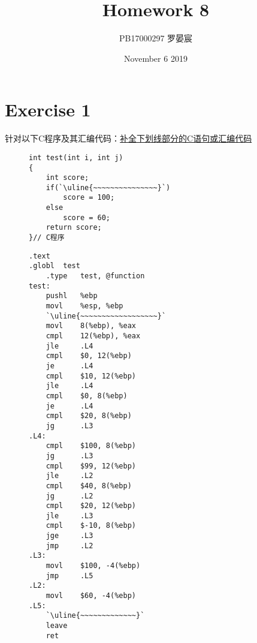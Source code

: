 \documentclass{article}
\title{Homework 8}
\author{PB17000297 罗晏宸}
\date{November 6 2019}
\begin{document}
\maketitle

\section*{Exercise 1}
针对以下C程序及其汇编代码：\uline{补全下划线部分的C语句或汇编代码}

\begin{figure}[H]
    \centering
    \begin{lstlisting}[style = C]
int test(int i, int j)
{
    int score;
    if(`\uline{~~~~~~~~~~~~~~~}`)
        score = 100;
    else
        score = 60;
    return score;
}// C程序
    \end{lstlisting}
\end{figure}

\begin{figure}[H]
    \centering
    \begin{lstlisting}[style = Assembler, lineskip = 0.2em]
.text
.globl  test
    .type   test, @function
test:
    pushl   %ebp
    movl    %esp, %ebp
    `\uline{~~~~~~~~~~~~~~~~~~}`
    movl    8(%ebp), %eax
    cmpl    12(%ebp), %eax
    jle     .L4
    cmpl    $0, 12(%ebp)
    je      .L4
    cmpl    $10, 12(%ebp)
    jle     .L4
    cmpl    $0, 8(%ebp)
    je      .L4
    cmpl    $20, 8(%ebp)
    jg      .L3
.L4:
    cmpl    $100, 8(%ebp)
    jg      .L3
    cmpl    $99, 12(%ebp)
    jle     .L2
    cmpl    $40, 8(%ebp)
    jg      .L2
    cmpl    $20, 12(%ebp)
    jle     .L3
    cmpl    $-10, 8(%ebp)
    jge     .L3
    jmp     .L2
.L3:
    movl    $100, -4(%ebp)
    jmp     .L5
.L2:
    movl    $60, -4(%ebp)
.L5:
    `\uline{~~~~~~~~~~~~~}`
    leave
    ret
    \end{lstlisting}
\end{figure}

\end{document}
